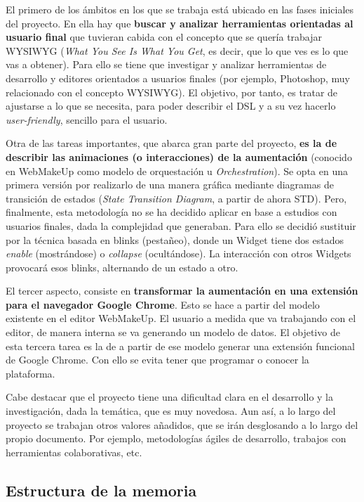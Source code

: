 El primero de los ámbitos en los que se trabaja está ubicado en las fases iniciales del proyecto. En ella hay que \textbf{buscar y analizar herramientas orientadas al usuario final} que tuvieran cabida con el concepto que se quería trabajar WYSIWYG (\emph{What You See Is What You Get}, es decir, que lo que ves es lo que vas a obtener). Para ello se tiene que investigar y analizar herramientas de desarrollo y editores orientados a usuarios finales (por ejemplo, Photoshop, muy relacionado con el concepto WYSIWYG). El objetivo, por tanto, es tratar de ajustarse a lo que se necesita, para poder describir el DSL y a su vez hacerlo \emph{user-friendly}, sencillo para el usuario.

Otra de las tareas importantes, que abarca gran parte del proyecto, \textbf{es la de describir las animaciones (o interacciones) de la aumentación} (conocido en WebMakeUp como modelo de orquestación u \emph{Orchestration}). Se opta en una primera versión por realizarlo de una manera gráfica mediante diagramas de transición de estados (\emph{State Transition Diagram}, a partir de ahora STD). Pero, finalmente, esta metodología no se ha decidido aplicar en base a estudios con usuarios finales, dada la complejidad que generaban. Para ello se decidió sustituir por la técnica basada en blinks (pestañeo), donde un Widget tiene dos estados \emph{enable} (mostrándose) o \emph{collapse} (ocultándose). La interacción con otros Widgets provocará esos blinks, alternando de un estado a otro.

El tercer aspecto, consiste en \textbf{transformar la aumentación en una extensión para el navegador Google Chrome}. Esto se hace a partir del modelo existente en el editor WebMakeUp. El usuario a medida que va trabajando con el editor, de manera interna se va generando un modelo de datos. El objetivo de esta tercera tarea es la de a partir de ese modelo generar una extensión funcional de Google Chrome. Con ello se evita tener que programar o conocer la plataforma. 

Cabe destacar que el proyecto tiene una dificultad clara en el desarrollo y la investigación, dada la temática, que es muy novedosa. Aun así, a lo largo del proyecto se trabajan otros valores añadidos, que se irán desglosando a lo largo del propio documento. Por ejemplo, metodologías ágiles de desarrollo, trabajos con herramientas colaborativas, etc.

\subsection{Estructura de la memoria}

